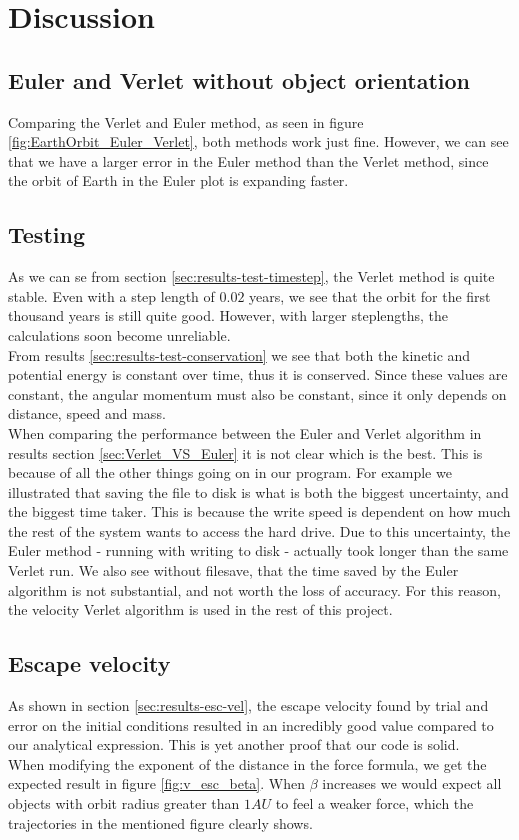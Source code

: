 \documentclass[../main.tex]{subfiles}
\begin{document}
\section{Discussion}\label{sec:discussion}

\subsection{Euler and Verlet without object orientation}
Comparing the Verlet and Euler method, as seen in figure \ref{fig:EarthOrbit_Euler_Verlet}, both methods work just fine. However, we can see that we have a larger error in the Euler method than the Verlet method, since the orbit of Earth in the Euler plot is expanding faster.

\subsection{Testing}
As we can se from section \ref{sec:results-test-timestep}, the Verlet method is quite stable. Even with a step length of $0.02$ years, we see that the orbit for the first thousand years is still quite good. However, with larger steplengths, the calculations soon become unreliable. \\
From results \ref{sec:results-test-conservation} we see that both the kinetic and potential energy is constant over time, thus it is conserved. Since these values are constant, the angular momentum must also be constant, since it only depends on distance, speed and mass. \\
When comparing the performance between the Euler and Verlet algorithm in results section \ref{sec:Verlet_VS_Euler} it is not clear which is the best. This is because of all the other things going on in our program. For example we illustrated that saving the file to disk is what is both the biggest uncertainty, and the biggest time taker. This is because the write speed is dependent on how much the rest of the system wants to access the hard drive. Due to this uncertainty, the Euler method - running with writing to disk - actually took longer than the same Verlet run. We also see without filesave, that the time saved by the Euler algorithm is not substantial, and not worth the loss of accuracy. For this reason, the velocity Verlet algorithm is used in the rest of this project.

\subsection{Escape velocity}
As shown in section \ref{sec:results-esc-vel}, the escape velocity found by trial and error on the initial conditions resulted in an incredibly good value compared to our analytical expression. This is yet another proof that our code is solid. \\
When modifying the exponent of the distance in the force formula, we get the expected result in figure \ref{fig:v_esc_beta}. When $\beta$ increases we would expect all objects with orbit radius greater than $1AU$ to feel a weaker force, which the trajectories in the mentioned figure clearly shows.
\end{document}

